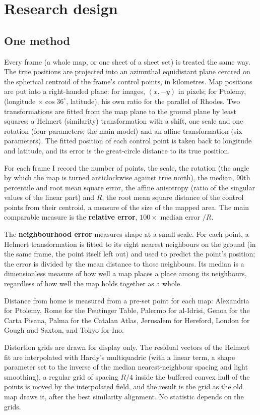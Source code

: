 \documentclass[11pt,a4paper]{article}
\begin{document}
\section{Research design}\label{sec:design}
\subsection{One method}
Every frame (a whole map, or one sheet of a sheet set) is treated the same way. The true positions are projected into an azimuthal equidistant plane centred on the spherical centroid of the frame's control points, in kilometres. Map positions are put into a right-handed plane: for images, $(x, -y)$ in pixels; for Ptolemy, (longitude $\times \cos 36^\circ$, latitude), his own ratio for the parallel of Rhodes. Two transformations are fitted from the map plane to the ground plane by least squares: a Helmert (similarity) transformation with a shift, one scale and one rotation (four parameters; the main model) and an affine transformation (six parameters). The fitted position of each control point is taken back to longitude and latitude, and its error is the great-circle distance to its true position.

For each frame I record the number of points, the scale, the rotation (the angle by which the map is turned anticlockwise against true north), the median, 90th percentile and root mean square error, the affine anisotropy (ratio of the singular values of the linear part) and $R$, the root mean square distance of the control points from their centroid, a measure of the size of the mapped area. The main comparable measure is the \textbf{relative error}, $100 \times$ median error $/ R$.

The \textbf{neighbourhood error} measures shape at a small scale. For each point, a Helmert transformation is fitted to its eight nearest neighbours on the ground (in the same frame, the point itself left out) and used to predict the point's position; the error is divided by the mean distance to those neighbours. Its median is a dimensionless measure of how well a map places a place among its neighbours, regardless of how well the map holds together as a whole.

Distance from home is measured from a pre-set point for each map: Alexandria for Ptolemy, Rome for the Peutinger Table, Palermo for al-Idrisi, Genoa for the Carta Pisana, Palma for the Catalan Atlas, Jerusalem for Hereford, London for Gough and Saxton, and Tokyo for Ino.

Distortion grids are drawn for display only. The residual vectors of the Helmert fit are interpolated with Hardy's multiquadric (with a linear term, a shape parameter set to the inverse of the median nearest-neighbour spacing and light smoothing), a regular grid of spacing $R/4$ inside the buffered convex hull of the points is moved by the interpolated field, and the result is the grid as the old map draws it, after the best similarity alignment. No statistic depends on the grids.
\end{document}
